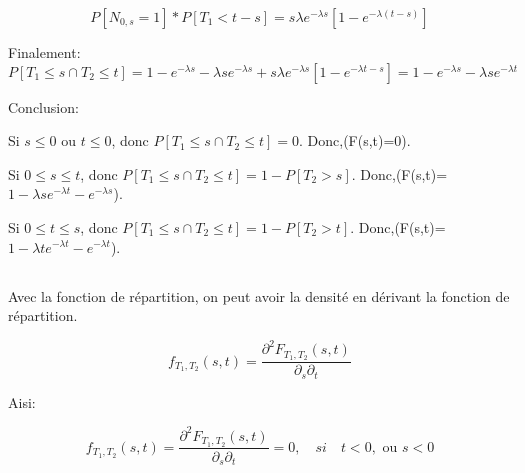 \documentclass[a4paper]{article}
\begin{document}
\begin{equation*}
P[N_{0,s}=1]*P[T_1<t-s]=s\lambda e^{-\lambda s}[1-e^{-\lambda{(t-s)}}]
\end{equation*}

Finalement:
\begin{equation}
P[{T_1 \leq s} \cap  {T_2 \leq t}] =
1   -   e^{-\lambda   s}-   \lambda  s   e^{-\lambda   s}+s\lambda   e^{-\lambda
  s}[1-e^{-\lambda{t-s}}]= 1 - e^{-\lambda s} - \lambda se^{-\lambda   t}
\end{equation}

Conclusion: 

Si $s \leq 0$ ou $t \leq 0$, donc $P[{T_1 \leq s} \cap {T_2 \leq t}]=0$. Donc,(F(s,t)=0).

Si $0 \leq s \leq t $, donc $P[{T_1 \leq s} \cap {T_2 \leq t}]=1-P[T_2 > s]$. Donc,(F(s,t)=$1 - \lambda se^{-\lambda t} - e^{-\lambda s}$).

Si $0 \leq t \leq s $, donc $P[{T_1 \leq s} \cap {T_2 \leq t}]=1-P[T_2 > t]$. Donc,(F(s,t)=$1 - \lambda te^{-\lambda t} - e^{-\lambda t}$).


\subsection{}



Avec la fonction de répartition, on  peut avoir la densité en dérivant la fonction
de répartition. 

 \begin{equation}
 f_{T_1,T_2}(s,t)   =   \frac{ \partial^2F_{T_1,T_2}(s,t)}{\partial_{s}\partial_{t}} 
 \end{equation}

Aisi:

 \begin{equation*}
 f_{T_1,T_2}(s,t)                                                               =
 \frac{  \partial^2F_{T_1,T_2}(s,t)}{\partial_{s}\partial_{t}}=0,  \quad si  \quad
 t<0,\text{ ou } s<0
 \end{equation*}
\end{document}
